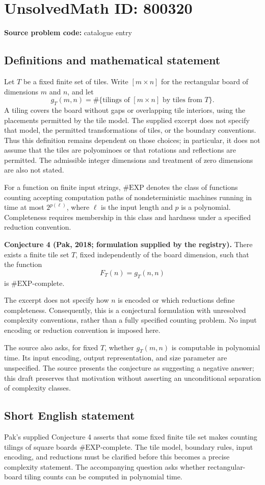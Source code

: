 \documentclass[11pt]{article}
\begin{document}
\section*{UnsolvedMath ID: 800320}
\textbf{Source problem code:} catalogue entry
\subsection{Definitions and mathematical statement}
Let \(T\) be a fixed finite set of tiles. Write \([m\times n]\) for the rectangular board of dimensions \(m\) and \(n\), and let
\[
g_T(m,n)=\#\{\text{tilings of }[m\times n]\text{ by tiles from }T\}.
\]
A tiling covers the board without gaps or overlapping tile interiors, using the placements permitted by the tile model. The supplied excerpt does not specify that model, the permitted transformations of tiles, or the boundary conventions. Thus this definition remains dependent on those choices; in particular, it does not assume that the tiles are polyominoes or that rotations and reflections are permitted. The admissible integer dimensions and treatment of zero dimensions are also not stated.

For a function on finite input strings, \(\#\mathrm{EXP}\) denotes the class of functions counting accepting computation paths of nondeterministic machines running in time at most \(2^{p(\ell)}\), where \(\ell\) is the input length and \(p\) is a polynomial. Completeness requires membership in this class and hardness under a specified reduction convention.

\textbf{Conjecture 4 (Pak, 2018; formulation supplied by the registry).} There exists a finite tile set \(T\), fixed independently of the board dimension, such that the function
\[
F_T(n)=g_T(n,n)
\]
is \(\#\mathrm{EXP}\)-complete.

The excerpt does not specify how \(n\) is encoded or which reductions define completeness. Consequently, this is a conjectural formulation with unresolved complexity conventions, rather than a fully specified counting problem. No input encoding or reduction convention is imposed here.

The source also asks, for fixed \(T\), whether \(g_T(m,n)\) is computable in polynomial time. Its input encoding, output representation, and size parameter are unspecified. The source presents the conjecture as suggesting a negative answer; this draft preserves that motivation without asserting an unconditional separation of complexity classes.
\subsection{Short English statement}
Pak's supplied Conjecture 4 asserts that some fixed finite tile set makes counting tilings of square boards \(\#\mathrm{EXP}\)-complete. The tile model, boundary rules, input encoding, and reductions must be clarified before this becomes a precise complexity statement. The accompanying question asks whether rectangular-board tiling counts can be computed in polynomial time.
\end{document}

